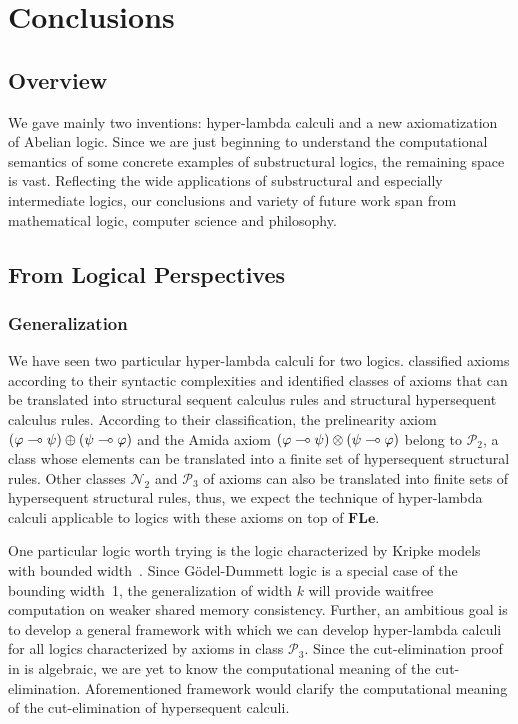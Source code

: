 \chapter{Conclusions}

\section{Overview}

We gave mainly two inventions: hyper-lambda calculi and a new
axiomatization of Abelian logic.
Since we are just beginning to understand the computational semantics of
some concrete examples of substructural logics, the remaining space is
vast.
Reflecting the wide applications of substructural and especially
intermediate logics,
our conclusions and variety of future work span from mathematical logic, computer
science and philosophy.

\section{From Logical Perspectives}

\subsection{Generalization}

We have seen two particular hyper-lambda calculi for two logics.
\citet{alg} classified axioms according to their syntactic complexities
and identified classes of axioms that can be translated into structural
sequent calculus rules and structural hypersequent calculus rules.
According to their classification, the prelinearity axiom
$(\varphi\multimap\psi)\oplus(\psi\multimap\varphi)$ and the Amida axiom
$(\varphi\multimap\psi)\otimes(\psi\multimap\varphi)$ belong to $\mathcal P_2$, a
class whose elements can be translated into a finite set of
hypersequent structural rules.
Other classes $\mathcal N_2$ and $\mathcal P_3$ of axioms can also be
translated into finite sets of hypersequent structural rules,
thus, we expect the technique of hyper-lambda calculi applicable to
logics with these axioms on top of $\mathbf{FLe}$.

One particular logic worth trying is
the logic characterized by Kripke models with bounded width~\citep{Ciabattoni01042001}.
Since G\"odel-Dummett logic is a special case of the bounding width~1,
the generalization of width $k$ will provide waitfree computation on
weaker shared memory consistency.  Further,
an ambitious goal is to develop a general framework with which we can
develop hyper-lambda calculi for all logics characterized by axioms in
class $\mathcal P_3$.
Since the cut-elimination proof in \citep{alg} is algebraic,
we are yet to know the computational meaning of the cut-elimination.
Aforementioned framework would clarify the computational meaning of the
cut-elimination of hypersequent calculi.

